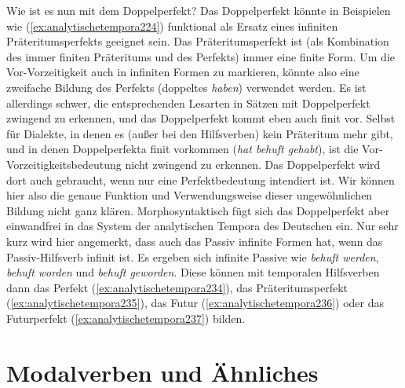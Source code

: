 Wie ist es nun mit dem Doppelperfekt?
Das Doppelperfekt könnte in Beispielen wie (\ref{ex:analytischetempora224}) funktional als Ersatz eines infiniten Präteritumsperfekts geeignet sein.
Das Präteritumsperfekt ist (als Kombination des immer finiten Präteritums und des Perfekts) immer eine finite Form.
Um die Vor-Vorzeitigkeit auch in infiniten Formen zu markieren, könnte also eine zweifache Bildung des Perfekts (doppeltes \textit{haben}) verwendet werden.
Es ist allerdings schwer, die entsprechenden Lesarten in Sätzen mit Doppelperfekt zwingend zu erkennen, und das Doppelperfekt kommt eben auch finit vor.
Selbst für Dialekte, in denen es (außer bei den Hilfsverben) kein Präteritum mehr gibt, und in denen Doppelperfekta finit vorkommen (\textit{hat behuft gehabt}), ist die Vor-Vorzeitigkeitsbedeutung nicht zwingend zu erkennen.
Das Doppelperfekt wird dort auch gebraucht, wenn nur eine Perfektbedeutung intendiert ist.
Wir können hier also die genaue Funktion und Verwendungsweise dieser ungewöhnlichen Bildung nicht ganz klären.
Morphosyntaktisch fügt sich das Doppelperfekt aber einwandfrei in das System der analytischen Tempora des Deutschen ein.
Nur sehr kurz wird hier angemerkt, dass auch das Passiv infinite Formen hat, wenn das Passiv-Hilfsverb infinit ist.
Es ergeben sich infinite Passive wie \textit{behuft werden}, \textit{behuft worden} und \textit{behuft geworden}.
Diese können mit temporalen Hilfsverben dann das Perfekt (\ref{ex:analytischetempora234}), das Präteritumsperfekt (\ref{ex:analytischetempora235}), das Futur (\ref{ex:analytischetempora236}) oder das Futurperfekt (\ref{ex:analytischetempora237}) bilden.


\begin{exe}
  \ex\label{ex:analytischetempora233}
  \begin{xlist}
  \end{xlist}
\end{exe}


\section{Modalverben und Ähnliches}
\label{sec:modalverbenundaehnliches}

